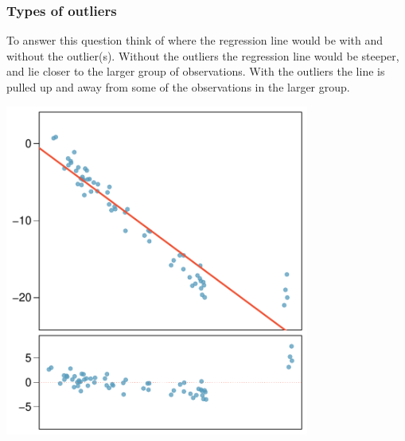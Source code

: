 \documentclass[notes,11pt, aspectratio=169]{beamer}
\begin{document}

\begin{frame}
\frametitle{Types of outliers}

{

To answer this question think of where the regression line would be with and without the outlier(s). Without the outliers the regression line would be steeper, and lie closer to the larger group of observations. With the outliers the line is pulled up and away from some of the observations in the larger group. 
}
{
\begin{center}
\includegraphics[width=0.75\textwidth]{graphs/out4}
\end{center}
}

\end{frame}

\end{document}
